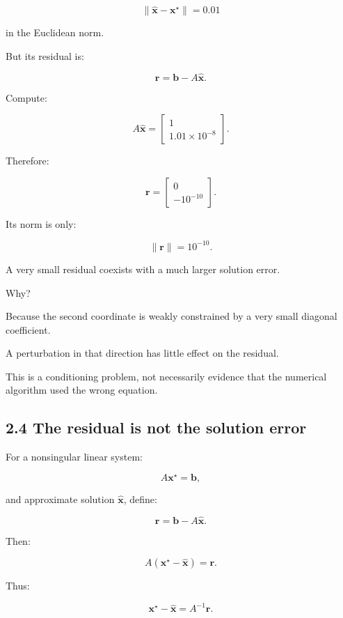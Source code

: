 \[ \|\hat{\mathbf x}-\mathbf x^\star\| =0.01 \]

in the Euclidean norm.

But its residual is:

\[ \mathbf r=\mathbf b-A\hat{\mathbf x}. \]

Compute:

\[ A\hat{\mathbf x} = \begin{bmatrix} 1\\ 1.01\times10^{-8} \end{bmatrix}. \]

Therefore:

\[ \mathbf r= \begin{bmatrix} 0\\ -10^{-10} \end{bmatrix}. \]

Its norm is only:

\[ \boxed{\|\mathbf r\|=10^{-10}}. \]

A very small residual coexists with a much larger solution error.

Why?

Because the second coordinate is weakly constrained by a very small diagonal coefficient.

A perturbation in that direction has little effect on the residual.

This is a conditioning problem, not necessarily evidence that the numerical algorithm used the wrong equation.

\subsection{2.4 The residual is not the solution error}\label{02-foundations-ii-ch028-the-residual-is-not-the-solution-error}

\hypertarget{02-foundations-ii-ch028-the-residual-is-not-the-solution-error}{}

For a nonsingular linear system:

\[ A\mathbf x^\star=\mathbf b, \]

and approximate solution \(\hat{\mathbf x}\), define:

\[ \mathbf r=\mathbf b-A\hat{\mathbf x}. \]

Then:

\[ A(\mathbf x^\star-\hat{\mathbf x})=\mathbf r. \]

Thus:

\[ \mathbf x^\star-\hat{\mathbf x} = A^{-1}\mathbf r. \]

